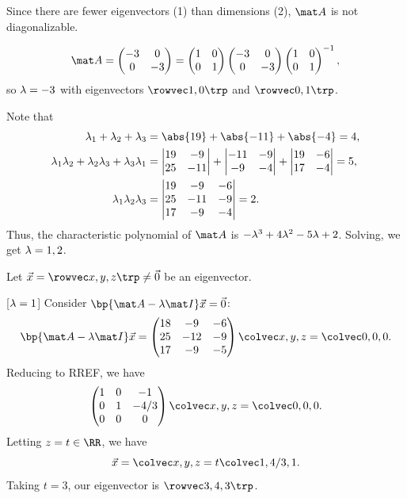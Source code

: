 \begin{solution}
\begin{ppart}
        Since there are fewer eigenvectors (1) than dimensions (2), $\mat A$ is not diagonalizable.
    \end{ppart}
    \begin{ppart}
        \[\mat A = \begin{pmatrix}-3 & 0 \\ 0 & -3\end{pmatrix} = \begin{pmatrix}1 & 0 \\ 0 & 1\end{pmatrix} \begin{pmatrix}-3 & 0 \\ 0 & -3\end{pmatrix} \begin{pmatrix}1 & 0 \\ 0 & 1\end{pmatrix}^{-1},\] so $\lambda = -3$ with eigenvectors $\cveciix10$ and $\cveciix01$.
    \end{ppart}
    \begin{ppart}
        Note that
        \begin{align*}
            \l_1 + \l_2 + \l_3 &= \abs{19} + \abs{-11} + \abs{-4} = 4,\\
            \l_1 \l_2 + \l_2 \l_3 + \l_3 \l_1 &= \begin{vmatrix}19 & -9 \\ 25 & -11\end{vmatrix} + \begin{vmatrix}-11 & -9 \\ -9 & -4\end{vmatrix} + \begin{vmatrix}19 & -6 \\ 17 & -4\end{vmatrix} = 5,\\
            \l_1 \l_2 \l_3 &= \begin{vmatrix}19 & -9 & -6 \\ 25 & -11 & -9 \\ 17 & -9 & -4\end{vmatrix} = 2.
        \end{align*}
        Thus, the characteristic polynomial of $\mat A$ is $-\lambda^3 + 4\lambda^2 - 5\lambda + 2$. Solving, we get $\lambda = 1, 2$.

        Let $\vec x = \cveciiix{x}{y}{z} \neq \vec 0$ be an eigenvector.

        [$\lambda = 1$] Consider $\bp{\mat A - \l \mat I} \vec x = \vec 0$: \[\bp{\mat A - \l \mat I} \vec x = \begin{pmatrix}18 & -9 & -6 \\ 25 & -12 & -9 \\ 17 & -9 & -5\end{pmatrix} \cveciii{x}{y}{z} = \cveciii000.\] Reducing to RREF, we have \[\begin{pmatrix}1 & 0 & -1 \\ 0 & 1 & -4/3 \\ 0 & 0 & 0\end{pmatrix} \cveciii{x}{y}{z} = \cveciii000.\] Letting $z = t \in \RR$, we have \[\vec x = \cveciii{x}{y}{z} = t\cveciii1{4/3}{1}.\] Taking $t = 3$, our eigenvector is $\cveciiix343$.


\end{ppart}
\end{solution}
